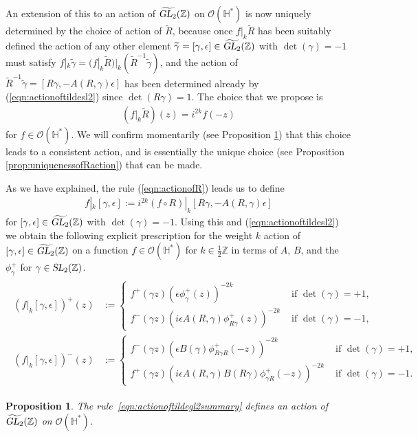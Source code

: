 \documentclass[aps,prd,groupedaddress,preprint,tightenlines,eqsecnum,nofootinbib]{revtex4}
\newcommand{\g}{\gamma}
\newcommand{\e}{\epsilon}
\newcommand{\SL}{\operatorname{\textsl{SL}}}      %
\newcommand{\GL}{\operatorname{\textsl{GL}}}      %
\newcommand{\Z}{{\mathbb Z}}%
\newcommand{\HH}{{\mathbb H}}%
\newcommand{\WT}{\widetilde}
\newcommand{\OO}{\mathcal{O}}
\newtheorem{prop}[thm]{Proposition}
\begin{document}
An extension of this to an action of $\widetilde{\GL_2}(\Z)$ on $\mathcal{O}(\HH^*)$ is now uniquely determined by the choice of action of $\WT R$, because once $f|_k\WT R$ has been suitably defined the action of any other element $\WT \g =[\g,\e]\in \widetilde{\GL_2}(\Z)$ with $\det(\g)=-1$ must satisfy $f|_k\WT\g=(f|_k\WT R)|_k(\WT R^{-1}\WT \g)$, and the action of $\WT R^{-1}\WT\g=[R\g,-A(R,\g)\e]$ has been determined already by (\ref{eqn:actionoftildesl2}) since $\det(R\g)=1$. The choice that we propose is
\begin{gather}\label{eqn:actionofR}
	(f|_k\WT R)(z)=i^{2k}f(-z)
\end{gather}
for $f\in \mathcal{O}(\HH^*)$. We will confirm momentarily (see Proposition \ref{prop:itisanaction}) that this choice leads to a consistent action, and is essentially the unique choice (see Proposition \ref{prop:uniquenessofRaction}) that can be made. 

As we have explained, the rule (\ref{eqn:actionofR}) leads us to define
\begin{gather}\label{eqn:actionofnegdetgamma}
	f|_k[\g,\e] :=i^{2k}(f\circ R)|_k[R\g,-A(R,\g)\e] 
\end{gather}
for $[\gamma,\e]\in \widetilde{\GL_2}(\Z)$ with $\det(\gamma)=-1$. Using this and (\ref{eqn:actionoftildesl2}) we obtain the following explicit prescription for the weight $k$ action of $[\g,\e]\in\widetilde{\GL_2}(\Z)$ on a function $f\in \mathcal{O}(\HH^*)$ for $k\in\frac12\Z$ in terms of $A$, $B$, and the $\phi^+_\g$ for $\g\in\SL_2(\Z)$. 
\begin{gather}\label{eqn:actionoftildegl2summary}
\begin{split}
	(f|_k[\g,\e])^+(z)&:=\begin{cases}
		f^+(\g z)(\e \phi^+_\g(z))^{-2k}&\text{ if }\det(\g)=+1,\\
		f^-(\g z)(i\e A(R,\g)\phi^+_{R\g}(z))^{-2k}&\text{ if }\det(\g)=-1,
	\end{cases}\\
	(f|_k[\g,\e])^-(z)&:=\begin{cases}
		f^-(\g z)(\e B(\g)\phi^+_{R\g R}(-z))^{-2k}&\text{ if }\det(\g)=+1,\\
		f^+(\g z)(i\e A(R,\g)B(R\g)\phi^+_{\g R}(-z))^{-2k}&\text{ if }\det(\g)=-1.
	\end{cases}
\end{split}
\end{gather}


\begin{prop}\label{prop:itisanaction}
The rule~\eqref{eqn:actionoftildegl2summary} defines an action of $\widetilde{\GL_2}(\Z)$ on $\OO(\HH^*)$. 
\end{prop}
\end{document}
